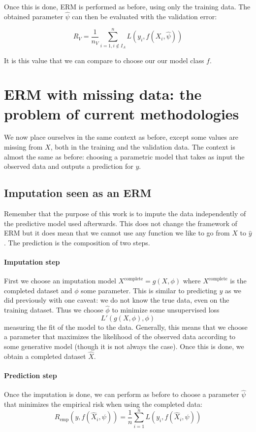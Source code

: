 \documentclass[12pt, a4paper]{memoir}
\begin{document}
Once this is done, ERM is performed as before, using only the training data. The obtained parameter $\hat{\psi}$ can then be evaluated with the validation error:

$$ R_{V} = \frac{1}{n_V} \sum\limits_{i=1, i \notin I_A}^n L(y_i, f(X_i, \hat{\psi}))$$

It is this value that we can compare to choose our our model class $f$.

	\section{ERM with missing data: the problem of current methodologies}
We now place ourselves in the same context as before, except some values are missing from $X$, both in the training and the validation data. The context is almost the same as before: choosing a parametric model that takes as input the observed data and outputs a prediction for $y$.
		\subsection{Imputation seen as an ERM}
Remember that the purpose of this work is to impute the data independently of the predictive model used afterwards. This does not change the framework of ERM but it does mean that we cannot use any function we like to go from $X$ to $\hat{y}$. The prediction is the composition of two steps.
			\paragraph{Imputation step}
First we choose an imputation model $X^{\text{complete}} = g(X, \phi)$ where $X^{\text{complete}}$ is the completed dataset and $\phi$ some parameter. This is similar to predicting $y$ as we did previously with one caveat: we do not know the true data, even on the training dataset. Thus we choose $\hat{\phi}$ to minimize some unsupervised loss
$$L'(g(X, \phi), \phi)$$
 measuring the fit of the model to the data. Generally, this means that we choose a parameter that maximizes the likelihood of the observed data according to some generative model (though it is not always the case). Once this is done, we obtain a completed dataset $\hat{X}$.

			\paragraph{Prediction step}
Once the imputation is done, we can perform as before to choose a parameter $\hat{\psi}$ that minimizes the empirical risk when using the completed data:
	$$ R_{\text{emp}}(y, f(\hat{X}_i, \psi)) = \frac{1}{n} \sum\limits_{i=1}^n L(y_i, f(\hat{X}_i, \psi))$$
	
\end{document}
